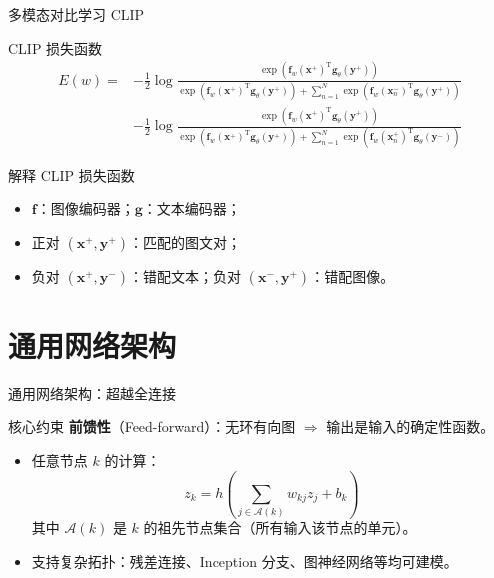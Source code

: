\documentclass[t,aspectratio=169]{beamer} %
\begin{document}
\begin{frame}{多模态对比学习 CLIP }
\begin{block}{CLIP 损失函数}
\begin{equation}
\begin{aligned}
    E(w) =&
    -\frac{1}{2}\log \frac{
        \exp\left(\mathbf{f}_w(\mathbf{x}^+)^\mathrm{T} \mathbf{g}_\theta(\mathbf{y}^+)\right)
        }{
        \exp\left(\mathbf{f}_w(\mathbf{x}^+)^\mathrm{T} \mathbf{g}_\theta(\mathbf{y}^+)\right)
        + 
        \sum_{n=1}^N 
        \exp\left(\mathbf{f}_w(\mathbf{x}_n^-)^\mathrm{T} \mathbf{g}_\theta(\mathbf{y}^+)\right)
        }\\
    &
    -\frac{1}{2}\log \frac{
        \exp\left(\mathbf{f}_w(\mathbf{x}^+)^\mathrm{T} \mathbf{g}_\theta(\mathbf{y}^+)\right)
        }{
        \exp\left(\mathbf{f}_w(\mathbf{x}^+)^\mathrm{T} \mathbf{g}_\theta(\mathbf{y}^+)\right)
        + 
        \sum_{n=1}^N 
        \exp\left(\mathbf{f}_w(\mathbf{x}_n^+)^\mathrm{T} \mathbf{g}_\theta(\mathbf{y}^-)\right)
        }
\end{aligned}
\tag{6.21}
\end{equation}
\end{block}

\begin{block}{解释 CLIP 损失函数}
    \begin{itemize}
    \item $\mathbf{f}$：图像编码器；$\mathbf{g}$：文本编码器；
    \item 正对 $(\mathbf{x}^+, \mathbf{y}^+)$：匹配的图文对；
    \item 负对 $(\mathbf{x}^+, \mathbf{y}^-)$：错配文本；负对 $(\mathbf{x}^-, \mathbf{y}^+)$：错配图像。
\end{itemize}
\end{block}

\end{frame}


\section{通用网络架构}
\begin{frame}{通用网络架构：超越全连接}
\begin{block}{核心约束}
    \textbf{前馈性}（Feed-forward）：无环有向图 $\Rightarrow$ 输出是输入的确定性函数。
\end{block}

\begin{itemize}
    \item 任意节点 $k$ 的计算：
    \begin{equation}
        z_k = h\left( \sum_{j \in \mathcal{A}(k)} w_{kj} z_j + b_k \right)
        \tag{6.22}
    \end{equation}
    其中 $\mathcal{A}(k)$ 是 $k$ 的祖先节点集合（所有输入该节点的单元）。
    
    \item 支持复杂拓扑：残差连接、Inception 分支、图神经网络等均可建模。
\end{itemize}
\end{frame}
\end{document}
